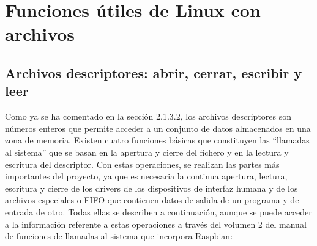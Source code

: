 \clearpage









\section{Funciones útiles de Linux con archivos} \label{s2_7}

\subsection{Archivos descriptores: abrir, cerrar, escribir y leer} \label{s2_7_1}

Como ya se ha comentado en la sección 2.1.3.2, los archivos descriptores son números enteros que permite acceder a un conjunto de datos almacenados en una zona de memoria. Existen cuatro funciones básicas que constituyen las ``llamadas al sistema'' que se basan en la apertura y cierre del fichero y en la lectura y escritura del descriptor. Con estas operaciones, se realizan las partes más importantes del proyecto, ya que es necesaria la continua apertura, lectura, escritura y cierre de los drivers de los dispositivos de interfaz humana y de los archivos especiales o FIFO que contienen datos de salida de un programa y de entrada de otro. Todas ellas se describen a continuación, aunque se puede acceder a la información referente a estas operaciones a través del volumen 2 del manual de funciones de llamadas al sistema que incorpora Raspbian:

